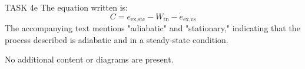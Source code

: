 TASK 4e  
The equation written is:  
\[
C = e_{\text{ex,stc}} - W_{\text{tn}} - \dot{e}_{\text{ex,vs}}
\]  
The accompanying text mentions "adiabatic" and "stationary," indicating that the process described is adiabatic and in a steady-state condition.

No additional content or diagrams are present.
